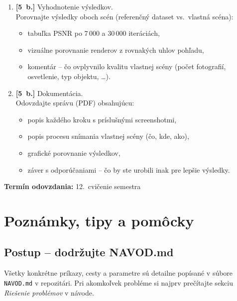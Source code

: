 \documentclass{article}
\begin{document}
\begin{enumerate}
Spustite celý postup rovnako ako v úlohe 1.
Uveďte dosiahnutú metriku PSNR a vizuálne porovnajte výsledok
s referenčným datasetom.

\item \textbf{[5~b.]} Vyhodnotenie výsledkov.\\
Porovnajte výsledky oboch scén (referenčný dataset vs.\ vlastná scéna):
\begin{itemize}
    \item tabuľka PSNR po 7\,000 a 30\,000 iteráciách,
    \item vizuálne porovnanie renderov z rovnakých uhlov pohľadu,
    \item komentár – čo ovplyvnilo kvalitu vlastnej scény
          (počet fotografií, osvetlenie, typ objektu, \ldots).
\end{itemize}

\item \textbf{[5~b.]} Dokumentácia.\\
Odovzdajte správu (PDF) obsahujúcu:
\begin{itemize}
    \item popis každého kroku s príslušnými screenshotmi,
    \item popis procesu snímania vlastnej scény (čo, kde, ako),
    \item grafické porovnanie výsledkov,
    \item záver s odporúčaniami – čo by ste urobili inak pre lepšie výsledky.
\end{itemize}

\end{enumerate}

\textbf{Termín odovzdania:} 12.\ cvičenie semestra

\newpage

\section*{Poznámky, tipy a pomôcky}

\subsection*{Postup – dodržujte NAVOD.md}

Všetky konkrétne príkazy, cesty a parametre sú detailne popísané v súbore
\texttt{NAVOD.md} v repozitári.
Pri akomkoľvek probléme si najprv prečítajte sekciu \emph{Riešenie problémov}
v návode.
\end{document}
